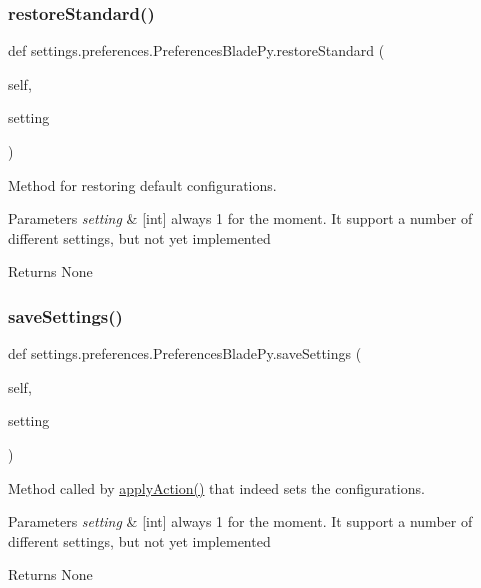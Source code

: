 \subsubsection{\texorpdfstring{restore\+Standard()}{restoreStandard()}}
{\footnotesize\ttfamily def settings.\+preferences.\+Preferences\+Blade\+Py.\+restore\+Standard (\begin{DoxyParamCaption}\item[{}]{self,  }\item[{}]{setting }\end{DoxyParamCaption})}



Method for restoring default configurations. 


\begin{DoxyParams}{Parameters}
{\em setting} & \mbox{[}int\mbox{]} always 1 for the moment. It support a number of different settings, but not yet implemented \\
\hline
\end{DoxyParams}
\begin{DoxyReturn}{Returns}
None 
\end{DoxyReturn}
\hypertarget{a00102_a9cfbfd7abab4ba14d80c573a0534040b}{}\label{a00102_a9cfbfd7abab4ba14d80c573a0534040b} 
\subsubsection{\texorpdfstring{save\+Settings()}{saveSettings()}}
{\footnotesize\ttfamily def settings.\+preferences.\+Preferences\+Blade\+Py.\+save\+Settings (\begin{DoxyParamCaption}\item[{}]{self,  }\item[{}]{setting }\end{DoxyParamCaption})}



Method called by \hyperlink{a00102_a8938a7b43ca7c5496a0ae7bf8d6a0c54}{apply\+Action()} that indeed sets the configurations. 


\begin{DoxyParams}{Parameters}
{\em setting} & \mbox{[}int\mbox{]} always 1 for the moment. It support a number of different settings, but not yet implemented \\
\hline
\end{DoxyParams}
\begin{DoxyReturn}{Returns}
None 
\end{DoxyReturn}


